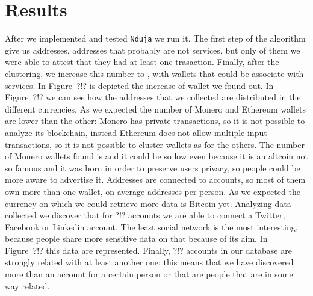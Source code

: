 \section{Results} \label{results}
After we implemented and tested \texttt{Nduja} we run it. The first step of the
algorithm give us \startingNumberAllWallets{} addresses,
\startingNumberWalletsNotService{} addresses that probably are not services,
but only \startingNumberWalletsAtLeastOneTransaction{} of them we were able to
attest that they had at least one trasaction. Finally, after the clustering,
we increase this number to \clusteringNumberAllWallets{}, with
\clusteringNumberWalletsNotService{} wallets that could be associate with
services. In Figure~?!? is depicted the increase of wallet we found out.
In Figure~?!? we can see how the addresses that we collected are distributed
in the different currencies. As we expected the number of Monero and Ethereum
wallets are lower than the other: Monero has private transactions, so it is not
possible to analyze its blockchain, instead Ethereum does not allow
multiple-input transactions, so it is not possible to cluster wallets as for
the others. The number of Monero wallets found is \startingXMR{} and it could
be so low even because it is an altcoin not so famous and it was born in order
to preserve users privacy, so people could be more aware to advertise it.
Addresses are connected to \accountNumber{} accounts, so most of them own more
than one wallet, on average \avarageAccount{} addresses per person.
As we expected the currency on which
we could retrieve more data is Bitcoin yet. Analyzing data collected we discover
that for ?!? accounts we are able to connect a Twitter, Facebook or Linkedin
account. The least social network is the most interesting, because people share
more sensitive data on that because of its aim. In Figure~?!? this data are
represented. Finally, ?!? accounts in our database are strongly related with at
least another one: this means that we have discovered more than an account for
a certain person or that are people that are in some way related.
